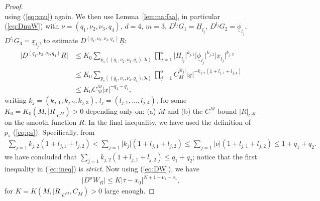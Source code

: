 \documentclass[reqno,12pt]{amsart}
\newcommand{\eqlab}[1]{\label{eq:#1}}
\renewcommand{\eqref}[1]{(\ref{eq:#1})}
\newcommand{\lemmaref}[1]{Lemma~\ref{lemma:#1}}
\numberwithin{equation}{section}
\begin{document}
\begin{proof}
\begin{equation}
                                                               \end{equation}
 using \eqref{xnu} again. We then use \lemmaref{faa}, in particular \eqref{DnuW} with $\nu=(q_1,\nu_2,\nu_3,q_4)$, $d=4$, $m=3$, $D^{l_{j}} G_1=\underline H_{l_{j}}$, $D^{l_{j}} G_2=\underline \phi_{l_{j}}$, $D^{l_{j}} G_3=\underline x_{l_{j}}$, to estimate $D^{(q_1,\nu_2,\nu_3,q_4)} \underline R$:
 \begin{align*}
  \vert D^{(q_1,\nu_2,\nu_3,q_4)} \underline R\vert &\le K_0 \sum_{p_s((q_1,\nu_2,\nu_3,q_4),\mathbf \lambda)} \prod_{j=1}^s \vert \underline H_{l_{j}}\vert^{k_{j,1}} \vert \underline \phi_{l_{j}}\vert^{k_{j,2}}\vert \underline x_{l_j}\vert^{k_{j,3}}\\
  &\le K_0  \sum_{p_s((q_1,\nu_2,\nu_3,q_4),\mathbf \lambda)} \prod_{j=1}^s C_M^{\vert k_{j}\vert} \vert \underline x\vert^{-k_{j,2}(1+l_{j,1}+l_{j,4})}\\
  &\le K_0 C_M^{M} \vert \underline x\vert^{-q_1-q_4},
 \end{align*}
 writing $k_j=(k_{j,1},k_{j,2},k_{j,3})$, $l_j = (l_{j,1},\ldots,l_{j,4})$,
 for some $K_0=K_0(M,\vert R\vert_{C^M})>0$ depending only on: (a) $M$ and (b) the $C^M$ bound $\vert R\vert_{C^M}$ on the smooth function $R$. In the final inequality, we have used the definition of $p_s$ \eqref{ps}. Specifically, from
\begin{align}
 \sum_{j=1} k_{j,2} (1+l_{j,1}+l_{j,2})<\sum_{j=1} \vert k_{j}\vert (1+l_{j,1}+l_{j,2})\le \sum_{j=1} \vert \nu\vert  (1+l_{j,1}+l_{j,2})\le 1+q_1+q_2.\eqlab{ineq}
\end{align}
 we have concluded that $\sum_{j=1} k_{j,2} (1+l_{j,1}+l_{j,2})\le q_1+q_2$; notice that the first inequality in \eqref{ineq} is \textit{strict}. 
Now using \eqref{DW}, we have
 \begin{align*}
  \vert D^{\mathbf \nu} W_R \vert \le K \vert \tau-x_0\vert^{N+1-\nu_1-\nu_4},
 \end{align*}
for $K=K(M,\vert R\vert_{C^M},C_M)>0$ large enough. 
 \end{proof}
\end{document}
